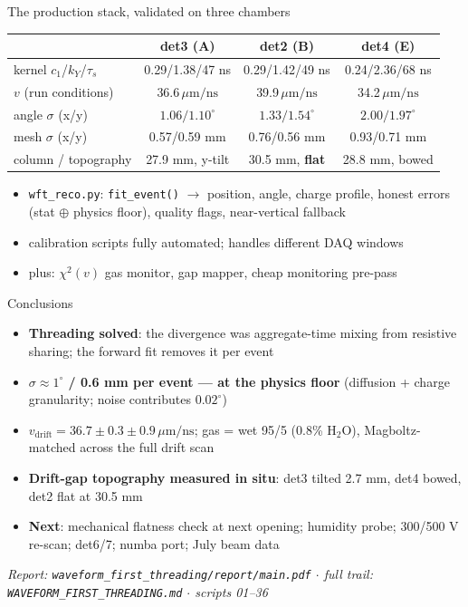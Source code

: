 \documentclass[10pt,aspectratio=169]{beamer}
\newcommand{\um}{\,\mu\mathrm{m/ns}}
\begin{document}
\begin{frame}{The production stack, validated on three chambers}
\centering
\small
\begin{tabular}{lccc}
\toprule
 & det3 (A) & det2 (B) & det4 (E)\\
\midrule
kernel $c_1$/$k_Y$/$\tau_s$ & 0.29/1.38/47 ns & 0.29/1.42/49 ns & 0.24/2.36/68 ns\\
$v$ (run conditions) & 36.6$\um$ & 39.9$\um$ & 34.2$\um$\\
angle $\sigma$ (x/y) & $1.06/1.10^\circ$ & $1.33/1.54^\circ$ & $2.00/1.97^\circ$\\
mesh $\sigma$ (x/y) & 0.57/0.59 mm & 0.76/0.56 mm & 0.93/0.71 mm\\
column / topography & 27.9 mm, y-tilt & 30.5 mm, \textbf{flat} & 28.8 mm, bowed\\
\bottomrule
\end{tabular}
\vspace{4mm}
\begin{itemize}\itemsep4pt
\item \texttt{wft\_reco.py}: \texttt{fit\_event()} $\to$ position, angle, charge profile,
honest errors (stat $\oplus$ physics floor), quality flags, near-vertical fallback
\item calibration scripts fully automated; handles different DAQ windows
\item plus: $\chi^2(v)$ gas monitor, gap mapper, cheap monitoring pre-pass
\end{itemize}
\end{frame}

\begin{frame}{Conclusions}
\begin{itemize}\itemsep8pt
\item \textbf{Threading solved}: the divergence was aggregate-time mixing from
resistive sharing; the forward fit removes it per event
\item \textbf{$\sigma\approx1^\circ$ / 0.6 mm per event --- at the physics floor}
(diffusion + charge granularity; noise contributes $0.02^\circ$)
\item \textbf{$v_\mathrm{drift}=36.7\pm0.3\pm0.9\um$}; gas = wet 95/5
(0.8\% H$_2$O), Magboltz-matched across the full drift scan
\item \textbf{Drift-gap topography measured in situ}: det3 tilted 2.7 mm,
det4 bowed, det2 flat at 30.5 mm
\item \textbf{Next}: mechanical flatness check at next opening; humidity probe;
300/500 V re-scan; det6/7; numba port; July beam data
\end{itemize}
\vspace{3mm}
\centering\small
\emph{Report: \texttt{waveform\_first\_threading/report/main.pdf} $\cdot$
full trail: \texttt{WAVEFORM\_FIRST\_THREADING.md} $\cdot$ scripts 01--36}
\end{frame}
\end{document}
